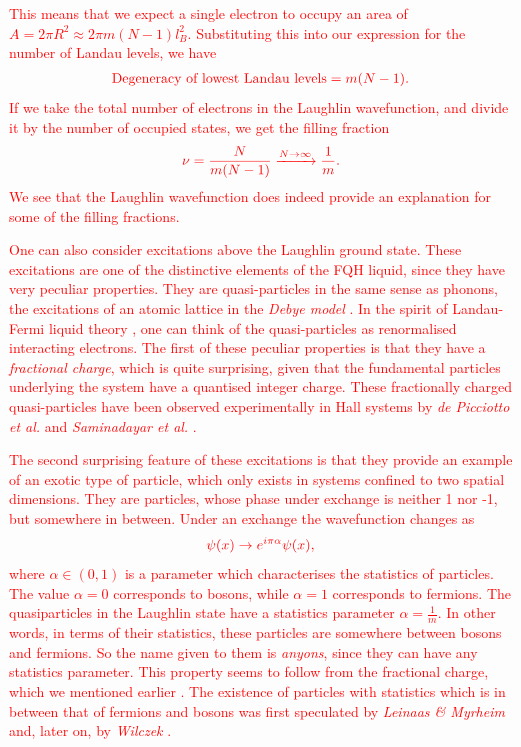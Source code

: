  \textcolor{red}{This means that we expect a single electron to occupy an area of $A= 2\pi R^2 \approx 2\pi m (N-1)l_B^2$. Substituting this into our expression for the number of Landau levels, we have}
\begin{align}
    \textcolor{red}{\text{Degeneracy of lowest Landau levels} = m(N-1). }
\end{align}
 \textcolor{red}{If we take the total number of electrons in the Laughlin wavefunction, and divide it by the number of occupied states, we get the filling fraction}
\begin{align}
    \textcolor{red}{\nu = \frac{N}{m (N-1)} \xrightarrow{N \rightarrow \infty} \frac{1}{m}.}
\end{align}
 \textcolor{red}{We see that the Laughlin wavefunction does indeed provide an explanation for some of the filling fractions. }

 \textcolor{red}{One can also consider excitations above the Laughlin ground state. These excitations are one of the distinctive elements of the FQH liquid, since they have very peculiar properties. They are quasi-particles in the same sense as phonons, the excitations of an atomic lattice in the \textit{Debye model} \cite{Debye1912}. In the spirit of Landau-Fermi liquid theory \cite{Landau:1956zuh}, one can think of the quasi-particles as renormali\textcolor{red}{s}ed interacting electrons. The first of these peculiar properties is that they have a \textit{fractional charge}, which is quite surprising, given that the fundamental particles underlying the system have a quanti\textcolor{red}{s}ed integer charge. These fractionally charged quasi-particles have been observed experimentally in Hall systems by \textit{de Picciotto et al.} and \textit{Saminadayar et al.} \cite{dePicciotto:1997qc, PhysRevLett.79.2526}.}

 \textcolor{red}{The second surprising feature of these excitations is that they provide an example of an exotic type of particle, which only exists in systems confined to two spatial dimensions. They are particles, whose phase under exchange is neither 1 nor -1, but somewhere in between. Under an exchange the wavefunction changes as}
\begin{align}
    \textcolor{red}{\psi(x) \rightarrow e^{ i\pi  \alpha} \psi(x),}
\end{align}
\textcolor{red}{where $\alpha \in (0,1)$ is a parameter which characteri\textcolor{red}{s}es the statistics of particles. The value $\alpha=0 $ corresponds to bosons, while $\alpha=1$ corresponds to fermions. The quasiparticles in the Laughlin state have a statistics parameter $\alpha = \frac{1}{m}$. In other words, in terms of their statistics, these particles are somewhere between bosons and fermions.  So the name given to them is \textit{anyons}, since they can have any statistics parameter. This property seems to follow from the fractional charge, which we mentioned earlier \cite{Halperin:1983zz, Wilczek:1981du, Polyakov:1988md}. The existence of particles with statistics which is in between that of fermions and bosons was first speculated by \textit{Leinaas \& Myrheim} \cite{Leinaas:1977fm} and, later on, by \textit{Wilczek} \cite{PhysRevLett.49.957}.}


